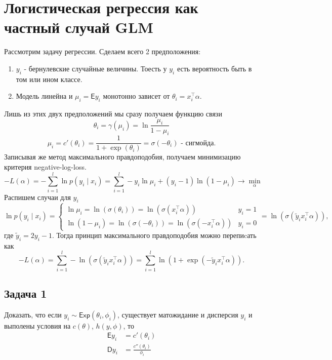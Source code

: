 \section*{Логистическая регрессия как частный случай GLM}
Рассмотрим задачу регрессии. Сделаем всего 2 предположения:
\begin{enumerate}
  \item $y_i$ - бернулевские случайные величины. Тоесть у $y_i$ есть вероятность быть в том или ином классе.
  \item Модель линейна и $\mu_i = \mathsf{E}y_i$ монотонно зависет от $\theta_i = x_i^\top\alpha$.
\end{enumerate}
Лишь из этих двух предположений мы сразу получаем функцию связи
$$
  \theta_i = \gamma(\mu_i) = \ln\frac{\mu_i}{1-\mu_i}
$$
$$
  \mu_i = c'(\theta_i) = \frac{1}{1+\exp(\theta_i)} = \sigma(-\theta_i) \text{ - сигмойда}.
$$
Записывая же метод максимального правдоподобия, получаем минимизацию критерия negative-log-loss.
$$
  -L(\alpha) = -\sum_{i=1}^l \ln p(y_i \mid x_i) = \sum_{i=1}^l -y_i \ln \mu_i + (y_i - 1) \ln (1 - \mu_i) \to \min_\alpha
$$
Распишем случаи для $y_i$
$$
  \ln p(y_i \mid x_i) = 
  \begin{cases}
    \ln\mu_i = \ln(\sigma(\theta_i)) = \ln(\sigma(x_i^\top\alpha))         & y_i = 1  \\
    \ln(1 - \mu_i) = \ln(\sigma(-\theta_i)) = \ln(\sigma(-x_i^\top\alpha)) & y_i = 0
  \end{cases} = \ln(\sigma(\widetilde{y}_ix_i^\top\alpha)),
$$
где $\widetilde{y}_i = 2y_i - 1$. Тогда принцип максимального правдоподобия можно перепиcать как
$$
  -L(\alpha) = \sum_{i=1}^l -\ln(\sigma(\widetilde{y}_ix_i^\top\alpha)) = 
  \sum_{i=1}^l \ln(1 + \exp(-\widetilde{y}_ix_i^\top\alpha)).
$$

\subsection*{Задача 1}

Доказать, что если $y_i \sim \mathsf{Exp}(\theta_i, \phi_i)$, существует матожидание и дисперсия $y_i$ и выполены условия на $c(\theta)$, $h(y, \phi)$, то
\begin{align*}
  \mathsf{E}y_i & = c'(\theta_i)                 \\
  \mathsf{D}y_i & = \frac{c''(\theta_i)}{\phi_i}
\end{align*}

